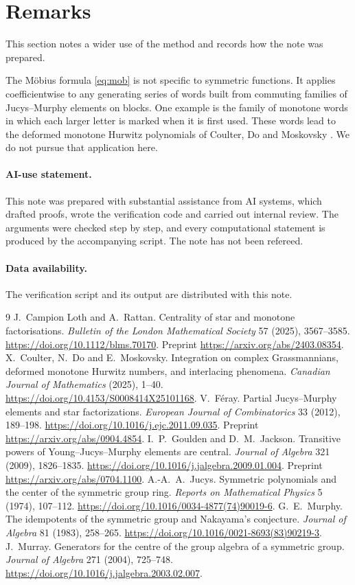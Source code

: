 \documentclass[11pt,a4paper]{article}
\theoremstyle{definition}
\begin{document}
\section{Remarks}\label{sec:remarks}
This section notes a wider use of the method and records how the note was prepared.

The M\"obius formula \eqref{eq:mob} is not specific to symmetric functions. It applies coefficientwise to any generating series of words built from commuting families of Jucys--Murphy elements on blocks. One example is the family of monotone words in which each larger letter is marked when it is first used. These words lead to the deformed monotone Hurwitz polynomials of Coulter, Do and Moskovsky \cite{cdm}. We do not pursue that application here.

\paragraph{AI-use statement.} This note was prepared with substantial assistance from AI systems, which drafted proofs, wrote the verification code and carried out internal review. The arguments were checked step by step, and every computational statement is produced by the accompanying script. The note has not been refereed.

\paragraph{Data availability.} The verification script and its output are distributed with this note.

\begin{thebibliography}{9}
 J.~Campion Loth and A.~Rattan. Centrality of star and monotone factorisations. \emph{Bulletin of the London Mathematical Society} 57 (2025), 3567--3585. \url{https://doi.org/10.1112/blms.70170}. Preprint \url{https://arxiv.org/abs/2403.08354}.
 X.~Coulter, N.~Do and E.~Moskovsky. Integration on complex Grassmannians, deformed monotone Hurwitz numbers, and interlacing phenomena. \emph{Canadian Journal of Mathematics} (2025), 1--40. \url{https://doi.org/10.4153/S0008414X25101168}.
 V.~F\'eray. Partial Jucys--Murphy elements and star factorizations. \emph{European Journal of Combinatorics} 33 (2012), 189--198. \url{https://doi.org/10.1016/j.ejc.2011.09.035}. Preprint \url{https://arxiv.org/abs/0904.4854}.
 I.~P.~Goulden and D.~M.~Jackson. Transitive powers of Young--Jucys--Murphy elements are central. \emph{Journal of Algebra} 321 (2009), 1826--1835. \url{https://doi.org/10.1016/j.jalgebra.2009.01.004}. Preprint \url{https://arxiv.org/abs/0704.1100}.
 A.-A.~A.~Jucys. Symmetric polynomials and the center of the symmetric group ring. \emph{Reports on Mathematical Physics} 5 (1974), 107--112. \url{https://doi.org/10.1016/0034-4877(74)90019-6}.
 G.~E.~Murphy. The idempotents of the symmetric group and Nakayama's conjecture. \emph{Journal of Algebra} 81 (1983), 258--265. \url{https://doi.org/10.1016/0021-8693(83)90219-3}.
 J.~Murray. Generators for the centre of the group algebra of a symmetric group. \emph{Journal of Algebra} 271 (2004), 725--748. \url{https://doi.org/10.1016/j.jalgebra.2003.02.007}.
\end{thebibliography}
\end{document}
